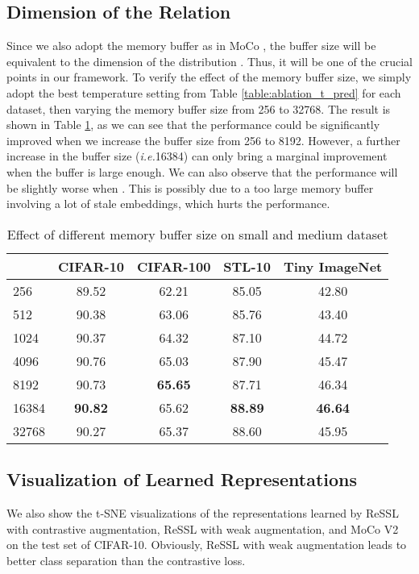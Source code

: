 \documentclass{article}
\newcommand{\<}{\left\langle}
\renewcommand{\>}{\right\rangle}
\newcommand{\ie}{{\emph{i.e.}}}
\begin{document}
\subsection{Dimension of the Relation}
Since we also adopt the memory buffer as in MoCo \cite{moco}, the buffer size will be equivalent to the dimension of the distribution  . Thus, it will be one of the crucial points in our framework. To verify the effect of the memory buffer size, we simply adopt the best temperature setting from Table \ref{table:ablation_t_pred} for each dataset, then varying the memory buffer size from 256 to 32768. The result is shown in Table \ref{table:ablation_buffer}, as we can see that the performance could be significantly improved when we increase the buffer size from 256 to 8192. However, a further increase in the buffer size (\ie 16384) can only bring a marginal improvement when the buffer is large enough. We can also observe that the performance will be slightly worse when . This is possibly due to a too large memory buffer involving a lot of stale embeddings, which hurts the performance.
\renewcommand\arraystretch{1.0}
\begin{table}[h]
 \centering
 \caption{Effect of different memory buffer size on small and medium dataset}
 \vspace{-10pt}
 \label{table:ablation_buffer}
\begin{tabular}{l c c c c} 
\toprule 
 & CIFAR-10 & CIFAR-100 & STL-10 & Tiny ImageNet \\ \hline
256   & 89.52 & 62.21 & 85.05  & 42.80 \\
512   & 90.38 & 63.06 & 85.76  & 43.40 \\
1024  & 90.37 & 64.32 & 87.10  & 44.72 \\
4096  & 90.76 & 65.03 & 87.90  & 45.47 \\
8192  & 90.73 & \textbf{65.65} & 87.71  & 46.34 \\
16384 & \textbf{90.82}  & 65.62 & \textbf{88.89}  & \textbf{46.64} \\
32768 & 90.27 & 65.37 & 88.60  & 45.95 \\
\bottomrule 
\end{tabular}
\vspace{-10pt}
\end{table}




\subsection{Visualization of Learned Representations}
We also show the t-SNE \cite{tsne} visualizations of the representations learned by ReSSL with contrastive augmentation, ReSSL with weak augmentation, and MoCo V2 on the test set of CIFAR-10. Obviously, ReSSL with weak augmentation leads to better class separation than the contrastive loss.
\end{document}
